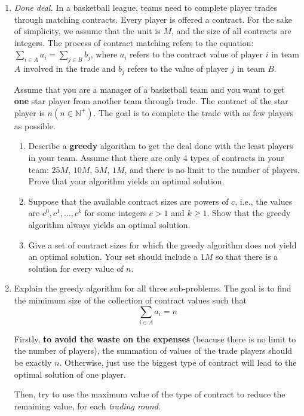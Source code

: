 \documentclass[12pt,a4paper]{article}
\makeatletter
\newtheorem*{solution}{Solution}
\theoremstyle{definition}
\renewenvironment{solution}[1][Solution] {\par\pushQED{\qed}\normalfont\topsep6\p@\@plus6\p@\relax\trivlist\item[\hskip\labelsep\bfseries#1\@addpunct{.}]\ignorespaces}{\popQED\endtrivlist\@endpefalse} \makeatother
\makeatother
\begin{document}
\begin{enumerate}
	\item \textit{Done deal.} In a basketball league, teams need to complete player trades through matching contracts. Every player is offered a contract. For the sake of simplicity, we assume that the unit is $ M $, and the size of all contracts are integers. The process of contract matching refers to the equation: $ \sum_{i\in A} a_{i}=\sum_{j\in B} b_{j} $, where $ a_{i} $ refers to the contract value of player $ i $ in team $A$ involved in the trade and $ b_{j} $ refers to the value of player $ j $ in team $B$. 
	
	Assume that you are a manager of a basketball team and you want to get \textbf{one} star player from another team through trade. The contract of the star player is $ n (n\in \mathbb{N}^+) $. The goal is to complete the trade with as few players as possible. 
	
	\begin{enumerate}
		\item Describe a \textbf{greedy} algorithm to get the deal done with the least players in your team. Assume that there are only 4 types of contracts in your team: $25M$, $ 10M $, $ 5M $, $ 1M $, and there is no limit to the number of players. Prove that your algorithm yields an optimal solution.
		\item Suppose that the available contract sizes are powers of $c$,
		i.e., the values are $c^{0}, c^{1}, \ldots, c^{k}$ for some integers $c>1$ and $k \geq 1$. Show that the greedy algorithm always yields an optimal solution.
		\item Give a set of contract sizes for which the greedy algorithm does not yield an optimal solution. Your set should include a $ 1M $ so that there is a solution for every value of $ n $.
	\end{enumerate}
    \begin{solution}
		Explain the greedy algorithm for all three sub-problems. The goal is to find the mimimum size of the collection of contract values such that 
		\begin{equation*}
			\sum_{i\in A} a_i = n
		\end{equation*}

		Firstly, \textbf{to avoid the waste on the expenses} (beacuse there is no limit to the number of players), the summation of values of the trade players should be exactly $n$. Otherwise, just use the biggest type of contract will lead to the optimal solution of one player.

		Then, try to use the maximum value of the type of contract to reduce the remaining value, for each \emph{trading round}. 


\end{solution}
\end{enumerate}
\end{document}
